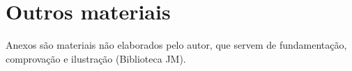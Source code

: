 \chapter{Outros materiais}
\label{cap:anexo}

Anexos são materiais não elaborados pelo autor, que servem de fundamentação, comprovação e ilustração (Biblioteca JM).
